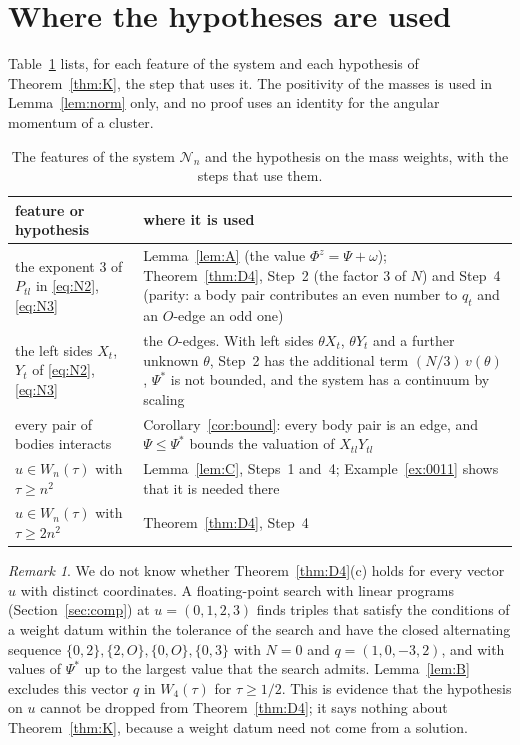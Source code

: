 \documentclass[11pt]{amsart}
\theoremstyle{definition}
\theoremstyle{remark}
\newtheorem{remark}[theorem]{Remark}
\numberwithin{equation}{section}
\newcommand{\cN}{\mathcal{N}}
\newcommand{\Ps}{\Psi^{*}}
\begin{document}
\section{Where the hypotheses are used}\label{sec:hyp}

Table~\ref{tab:hyp} lists, for each feature of the system and each hypothesis of Theorem~\ref{thm:K}, the
step that uses it. The positivity of the masses is used in Lemma~\ref{lem:norm} only, and no proof uses an identity for the
angular momentum of a cluster.

\begin{table}[ht]
\caption{The features of the system $\cN_n$ and the hypothesis on the mass weights, with the steps that
use them.}\label{tab:hyp}
\small
\begin{tabular}{@{}>{\raggedright}p{}>{\raggedright\arraybackslash}p{}@{}}
\toprule
feature or hypothesis & where it is used \\
\midrule
the exponent $3$ of $P_{tl}$ in \eqref{eq:N2}, \eqref{eq:N3} & Lemma~\ref{lem:A} (the value $\Phi^z = \Psi + \omega$); Theorem~\ref{thm:D4}, Step~2 (the factor $3$ of $N$) and Step~4 (parity: a body pair contributes an even number to $q_t$ and an $O$-edge an odd one) \\
the left sides $X_t$, $Y_t$ of \eqref{eq:N2}, \eqref{eq:N3} & the $O$-edges. With left sides $\theta X_t$, $\theta Y_t$ and a further unknown $\theta$, Step~2 has the additional term $(N/3)\, v(\theta)$, $\Ps$ is not bounded, and the system has a continuum by scaling \\
every pair of bodies interacts & Corollary~\ref{cor:bound}: every body pair is an edge, and $\Psi \le \Ps$ bounds the valuation of $X_{tl} Y_{tl}$ \\
$u \in W_n(\tau)$ with $\tau \ge n^2$ & Lemma~\ref{lem:C}, Steps~1 and~4; Example~\ref{ex:0011} shows that it is needed there \\
$u \in W_n(\tau)$ with $\tau \ge 2n^2$ & Theorem~\ref{thm:D4}, Step~4 \\
\bottomrule
\end{tabular}
\end{table}

\begin{remark}\label{rem:u0123}
We do not know whether Theorem~\ref{thm:D4}(c) holds for every vector $u$ with distinct coordinates. A
floating-point search with linear programs (Section~\ref{sec:comp}) at $u = (0, 1, 2, 3)$ finds triples
that satisfy the conditions of a weight datum within the tolerance of the search and have the closed
alternating sequence
$\{0, 2\}, \{2, O\}, \{0, O\}, \{0, 3\}$ with $N = 0$ and $q = (1, 0, -3, 2)$, and with values of $\Ps$
up to the largest value that the search admits. Lemma~\ref{lem:B} excludes this vector $q$ in $W_4(\tau)$ for
$\tau \ge 1/2$. This is evidence that the hypothesis on $u$ cannot be dropped from
Theorem~\ref{thm:D4}; it says nothing about Theorem~\ref{thm:K}, because a weight datum need not come
from a solution.
\end{remark}
\end{document}
